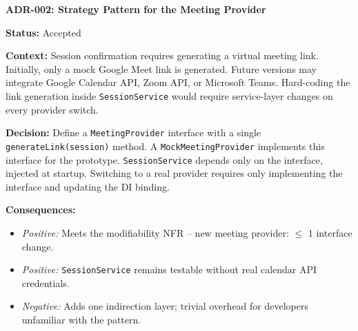 \documentclass[12pt,a4paper]{article}
\begin{document}
\begin{adrbox}
\textbf{ADR-002: Strategy Pattern for the Meeting Provider}

\textbf{Status:} Accepted

\textbf{Context:} Session confirmation requires generating a virtual meeting link. Initially, only a mock Google Meet link is generated. Future versions may integrate Google Calendar API, Zoom API, or Microsoft Teams. Hard-coding the link generation inside \texttt{SessionService} would require service-layer changes on every provider switch.

\textbf{Decision:} Define a \texttt{MeetingProvider} interface with a single \texttt{generateLink(session)} method. A \texttt{MockMeetingProvider} implements this interface for the prototype. \texttt{SessionService} depends only on the interface, injected at startup. Switching to a real provider requires only implementing the interface and updating the DI binding.

\textbf{Consequences:}
\begin{itemize}[leftmargin=*,topsep=2pt]
  \item \textit{Positive:} Meets the modifiability NFR -- new meeting provider: $\leq$ 1 interface change.
  \item \textit{Positive:} \texttt{SessionService} remains testable without real calendar API credentials.
  \item \textit{Negative:} Adds one indirection layer; trivial overhead for developers unfamiliar with the pattern.
\end{itemize}
\end{adrbox}

\vspace{0.8em}
\end{document}
